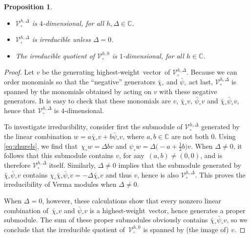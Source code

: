 \documentclass[10pt,a4paper]{amsart}
\numberwithin{equation}{section}
\newcommand{\bchi}{\bar{\chi}{}} %
\newcommand{\bpsi}{\bar{\psi}{}} %
\newcommand{\fld}[1]{\mathbb{#1}} %
\newcommand{\Mod}[1]{\mathcal{#1}} %
\newcommand{\CC}{\fld{C}}
\newcommand{\zh}[1]{#1_{\circ}} %
\newcommand{\zhver}[1]{\zh{\Mod{V}}^{#1}} %
\newcommand{\hw}{highest-weight}
\newcommand{\hwv}{\hw\ vector}
\newtheorem{Proposition}[Theorem]{Proposition}
\def\smash#1{#1}
\begin{document}
\begin{Proposition} \label{prop:vermas}
\
	\begin{itemize}\itemsep=0pt
		\item \smash{$\zhver{h,\Delta}$} is $4$-dimensional, for all $h,\Delta \in \CC$.
		\item \smash{$\zhver{h,\Delta}$} is irreducible unless $\Delta=0$.
		\item The irreducible quotient of $\zhver{h,0}$ is $1$-dimensional, for all $h\in\CC$.
	\end{itemize}
\end{Proposition}

\begin{proof}
	Let $v$ be the generating \hwv\ of \smash{$\zhver{h,\Delta}$}.
	Because we can order monomials so that the ``negative'' generators $\zh{\bchi}$ and $\zh{\bpsi}$ act last, \smash{$\zhver{h,\Delta}$} is spanned by the monomials obtained by acting on $v$ with these negative generators.
	It is easy to check that these monomials are $v$, $\zh{\bchi} v$, $\zh{\bpsi} v$ and $\zh{\bchi} \zh{\bpsi} v$, hence that \smash{$\zhver{h,\Delta}$} is $4$-dimensional.

	To investigate irreducibility, consider first the submodule of \smash{$\zhver{h,\Delta}$} generated by the linear combination $w = a \zh{\bchi} v + b \zh{\bpsi} v$, where $a,b \in \CC$ are not both $0$.
	Using \eqref{eq:zhurels}, we find that~${\zh{\chi} w = \Delta bv}$ and $\zh{\psi} w = \Delta \bigl(-a+\frac{1}{2}b\bigr) v$.
	When $\Delta \ne 0$, it follows that this submodule contains $v$, for any~${(a,b) \ne (0,0)}$, and is therefore \smash{$\zhver{h,\Delta}$} itself.
	Similarly, $\Delta \ne 0$ implies that the submodule generated by $\zh{\bchi}\zh{\bpsi} v$ contains $\zh{\chi}\zh{\bchi}\zh{\bpsi} v = -\Delta \zh{\bchi} v$ and thus $v$, hence is also \smash{$\zhver{h,\Delta}$}.
	This proves the irreducibility of Verma modules when $\Delta \ne 0$.

	When $\Delta = 0$, however, these calculations show that every nonzero linear combination of~$\zh{\bchi} v$ and $\zh{\bpsi} v$ is a \hwv, hence generates a proper submodule.
	The sum of these proper submodules obviously contains $\zh{\bchi} \zh{\bpsi} v$, so we conclude that the irreducible quotient of~$\zhver{h,0}$ is spanned by (the image of) $v$.
\end{proof}
\end{document}
